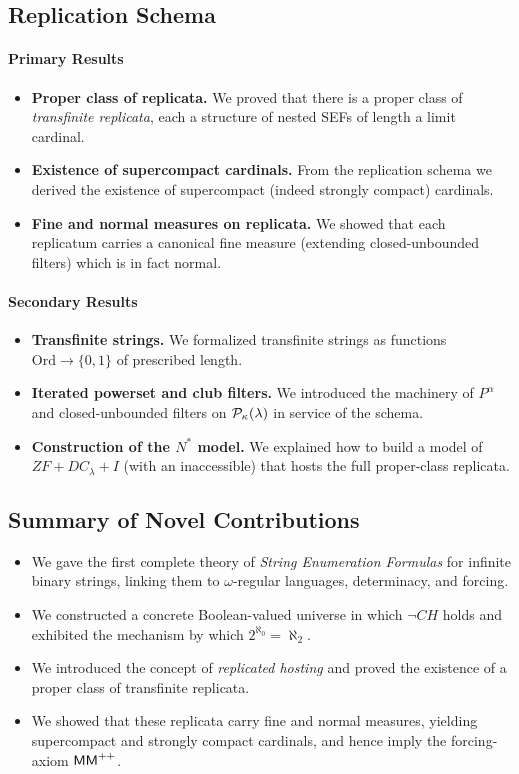\subsection*{Replication Schema}
\paragraph{Primary Results}
\begin{itemize}
  \item \textbf{Proper class of replicata.}  We proved that there is a proper class of \emph{transfinite replicata}, each a structure of nested SEFs of length a limit cardinal.  
  \item \textbf{Existence of supercompact cardinals.}  From the replication schema we derived the existence of supercompact (indeed strongly compact) cardinals.  
  \item \textbf{Fine and normal measures on replicata.}  We showed that each replicatum carries a canonical fine measure (extending closed-unbounded filters) which is in fact normal.  
\end{itemize}

\paragraph{Secondary Results}
\begin{itemize}
  \item \textbf{Transfinite strings.}  We formalized transfinite strings as functions $\mathrm{Ord}\to\{0,1\}$ of prescribed length.  
  \item \textbf{Iterated powerset and club filters.}  We introduced the machinery of $P^\alpha$ and closed-unbounded filters on $\mathcal{P}_\kappa(\lambda)$ in service of the schema.  
  \item \textbf{Construction of the $N^*$ model.}  We explained how to build a model of $ZF+DC_\lambda+I$ (with an inaccessible) that hosts the full proper-class replicata.  
\end{itemize}

\subsection*{Summary of Novel Contributions}
\begin{itemize}
  \item We gave the first complete theory of \emph{String Enumeration Formulas} for infinite binary strings, linking them to $\omega$-regular languages, determinacy, and forcing.  
  \item We constructed a concrete Boolean-valued universe in which $\neg CH$ holds and exhibited the mechanism by which $2^{\aleph_0}=\aleph_2$.  
  \item We introduced the concept of \emph{replicated hosting} and proved the existence of a proper class of transfinite replicata.  
  \item We showed that these replicata carry fine and normal measures, yielding supercompact and strongly compact cardinals, and hence imply the forcing-axiom ${\sf MM}^{++}$.  
\end{itemize}

